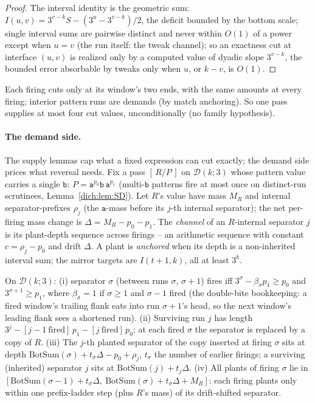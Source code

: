 \documentclass[runningheads,envcountsect]{llncs}
\begin{document}
\begin{proof}
    The interval identity is the geometric sum: $I(u,v) = 3^{v-k} S - (3^{u} - 3^{v-k})/2$, the deficit bounded by the bottom scale; single interval sums are pairwise distinct and never within $O(1)$ of a power except when $u = v$ (the run itself: the tweak channel); so an exactness cut at interface $(u,v)$ is realized only by a computed value of dyadic slope $3^{v-k}$, the bounded error absorbable by tweaks only when $u$, or $k - v$, is $O(1)$.
\end{proof}

\begin{lemma}
    \label{dich:lem:L2.2}
    Each firing cuts only at its window's two ends, with the same amounts at every firing; interior pattern runs are demands (by match anchoring). So one pass supplies at most four cut values, unconditionally (no family hypothesis).
\end{lemma}

\paragraph{The demand side.}
The supply lemmas cap what a fixed expression can cut exactly; the demand side prices what reversal needs. Fix a pass $[\,R/P\,]$ on $\mathcal D(k;3)$ whose pattern value carries a single $\mathtt b$: $P = \mathtt a^{p_0}\mathtt b\,\mathtt a^{p_1}$ (multi-$\mathtt b$ patterns fire at most once on distinct-run scrutinees, Lemma~\ref{dich:lem:SD}). Let $R$'s value have mass $M_R$ and internal separator-prefixes $\rho_j$ (the $\mathtt a$-mass before its $j$-th internal separator); the net per-firing mass change is $\Delta = M_R - p_0 - p_1$. The \emph{channel} of an $R$-internal separator $j$ is its plant-depth sequence across firings -- an arithmetic sequence with constant $c = \rho_j - p_0$ and drift $\Delta$. A plant is \emph{anchored} when its depth is a non-inherited interval sum; the mirror targets are $I(t{+}1,k)$, all at least $3^k$.

\begin{lemma}
    \label{dich:lem:M}
    On $\mathcal D(k;3)$: (i) separator $\sigma$ (between runs $\sigma$, $\sigma{+}1$) fires iff $3^{\sigma} - \beta_{\sigma} p_1 \ge p_0$ and $3^{\sigma+1} \ge p_1$, where $\beta_{\sigma} = 1$ if $\sigma \ge 1$ and $\sigma - 1$ fired (the double-bite bookkeeping: a fired window's trailing flank eats into run $\sigma{+}1$'s head, so the next window's leading flank sees a shortened run). (ii) Surviving run $j$ has length $3^{j} - [j{-}1\ \mathrm{fired}]\,p_1 - [j\ \mathrm{fired}]\,p_0$; at each fired $\sigma$ the separator is replaced by a copy of $R$. (iii) The $j$-th planted separator of the copy inserted at firing $\sigma$ sits at depth $\mathrm{BotSum}(\sigma) + t_{\sigma}\Delta - p_0 + \rho_j$, $t_{\sigma}$ the number of earlier firings; a surviving (inherited) separator $j$ sits at $\mathrm{BotSum}(j) + t_j \Delta$. (iv) All plants of firing $\sigma$ lie in $[\mathrm{BotSum}(\sigma{-}1) + t_{\sigma}\Delta,\ \mathrm{BotSum}(\sigma) + t_{\sigma}\Delta + M_R]$: each firing plants only within one prefix-ladder step (plus $R$'s mass) of its drift-shifted separator.
\end{lemma}
\end{document}
